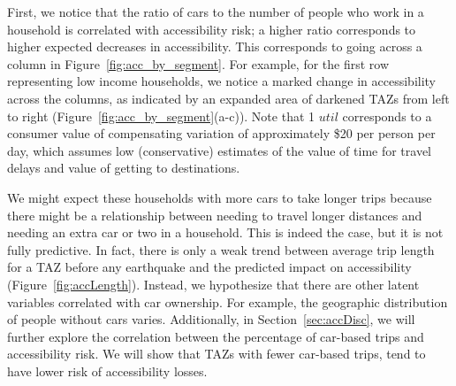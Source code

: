 First, we notice that the ratio of cars to the number of people who work in a household is  correlated with accessibility risk; a higher ratio corresponds to higher expected decreases in accessibility. This corresponds to going across a column in Figure~\ref{fig:acc_by_segment}. For example, for the first row representing low income households, 
 we notice a marked change in accessibility across the columns, as indicated by an expanded area of darkened TAZs from left to right (Figure~\ref{fig:acc_by_segment}{(a-c)}). Note that 1 $util$ corresponds to a consumer value of compensating variation of approximately \$20 per person per day, which assumes low (conservative) estimates of the value of time for travel delays and value of getting to destinations. 
 
We might expect these households with more cars to take longer trips because there might be a relationship between needing to travel longer distances and needing an extra car or two in a household. This is indeed the case, but it is not fully predictive. In fact, there is only a weak trend between average trip length for a TAZ before any earthquake and the predicted impact on accessibility (Figure~\ref{fig:accLength}). Instead, we hypothesize that there are other latent variables correlated with car ownership. For example, the geographic distribution of people without cars varies. Additionally, in Section~\ref{sec:accDisc}, we will further explore the correlation between the percentage of car-based trips and accessibility risk. We will show that TAZs with fewer car-based trips, tend to have lower risk of accessibility losses.




